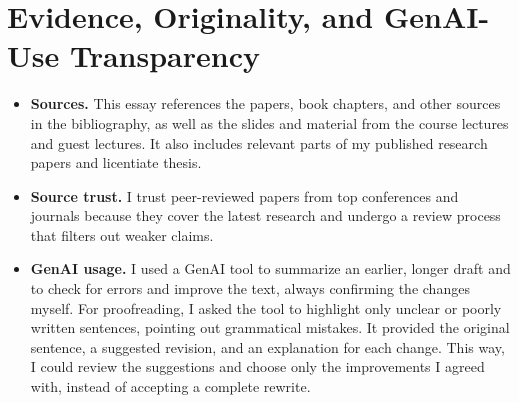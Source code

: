\documentclass[11pt]{article}
\begin{document}
\section{Evidence, Originality, and GenAI-Use Transparency}

\begin{itemize}
\item \textbf{Sources.} This essay references the papers, book chapters, and other sources in the bibliography, as well as the slides and material from the course lectures and guest lectures. It also includes relevant parts of my published research papers and licentiate thesis.
\item \textbf{Source trust.} I trust peer-reviewed papers from top conferences and journals because they cover the latest research and undergo a review process that filters out weaker claims.
\item \textbf{GenAI usage.} I used a GenAI tool to summarize an earlier, longer draft and to check for errors and improve the text, always confirming the changes myself. For proofreading, I asked the tool to highlight only unclear or poorly written sentences, pointing out grammatical mistakes. It provided the original sentence, a suggested revision, and an explanation for each change. This way, I could review the suggestions and choose only the improvements I agreed with, instead of accepting a complete rewrite.
\end{itemize}
\end{document}
